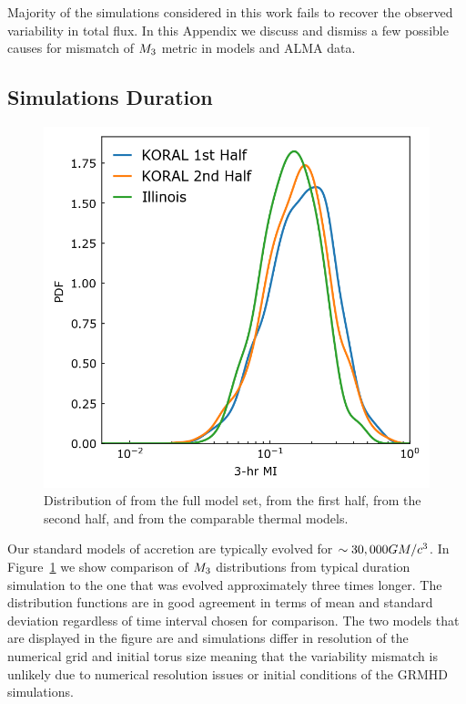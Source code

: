 

Majority of the simulations considered in this work fails to recover the \sgra observed variability in total flux.
In this Appendix we discuss and dismiss a few possible causes for mismatch of $M_{3}$ metric in models and ALMA data.

\subsection{Simulations Duration}\label{app:narayan}

\begin{figure}
  \centering
  \includegraphics[width=\columnwidth]{./figures/Koral_vs_IL_MI.png}
  \caption{Distribution of  from the full \koral model set, from the first half, from the second half, and from the comparable \kharma thermal models.}
  \label{fig:koral_MI}
\end{figure}

Our standard models of accretion are typically evolved for $\sim 30,000 GM/c^3$. In Figure~\ref{fig:koral_MI} we show comparison of $M_{3}$ distributions from typical duration simulation to the one that was evolved approximately three times longer. The distribution functions are in good agreement in terms of mean and standard deviation regardless of time interval chosen for comparison. The two models that are displayed in the figure are \kharma and \koral simulations differ in resolution of the numerical grid and initial torus size meaning that the variability mismatch is unlikely due to numerical resolution issues or initial conditions of the GRMHD simulations.

